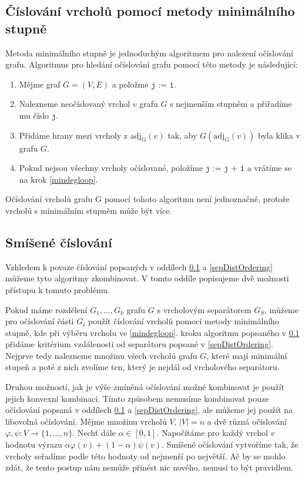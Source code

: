 \documentclass[11pt,american,czech,oneside]{book}
\theoremstyle{plain}
\theoremstyle{definition}
\begin{document}
\subsection{Číslování vrcholů pomocí metody minimálního stupně}
\label{MDordering}
Metoda minimálního stupně je jednoduchým algoritmem pro nalezení očíslování grafu. Algoritmus pro hledání očíslování grafu pomocí této metody je následující:

\begin{enumerate}
  \item Mějme graf $G=(V,E)$ a položme $\texttt{j := 1}$.
  \item \label{mindegloop}
      Nalezneme neočíslovaný vrchol $v$ grafu $G$ s nejmenším stupněm a přiřadíme mu číslo $\texttt{j}$.
  \item Přidáme hrany mezi vrcholy z $\mathrm{adj}_G(v)$ tak, aby $G(\mathrm{adj}_G(v))$ byla klika v grafu $G$.
  \item Pokud nejsou všechny vrcholy očíslované, položíme $\texttt{j := j + 1}$ a vrátíme se na krok \ref{mindegloop}.
\end{enumerate}

Očíslování vrcholů grafu G pomocí tohoto algoritmu není jednoznačné, protože vrcholů s minimálním stupněm může být více.

\subsection{Smíšené číslování}
\label{Mixedordering}
Vzhledem k povaze číslování popsaných v oddílech \ref{MDordering} a \ref{sepDistOrdering} můžeme tyto algoritmy zkombinovat. V tomto oddíle popisujeme dvě možnosti přístupu k tomuto problému.

Pokud máme rozdělení $G_1, \ldots, G_k$ grafu $G$ s vrcholovým separátorem $G_S$, můžeme pro očíslování části $G_i$ použít číslování vrcholů pomocí metody minimálního stupně, kde při výběru vrcholu ve \ref{mindegloop}. kroku algoritmu popsaného v \ref{MDordering} přidáme kritérium vzdálenosti od separátoru popsané v \ref{sepDistOrdering}. Nejprve tedy nalezneme množinu všech vrcholů grafu $G$, které mají minimální stupeň a poté z nich zvolíme ten, který je nejdál od vrcholového separátoru.

Druhou možností, jak je výše zmíněná očíslování možné kombinovat je použít jejich konvexní kombinaci. Tímto způsobem nemusíme kombinovat pouze očíslování popsaná v oddílech \ref{MDordering} a \ref{sepDistOrdering}, ale můžeme jej použít na libovolná očíslování. Mějme množinu vrcholů $V$, $|V|=n$ a dvě různá očíslování $\varphi,\psi :V \rightarrow \{1,\ldots,n\}$. Nechť dále $\alpha \in [0,1]$. Napočítáme pro každý vrchol $v$ hodnotu výrazu $\alpha\varphi(v) + (1-\alpha)\psi(v)$. Smíšené očíslování vytvoříme tak, že vrcholy seřadíme podle této hodnoty od nejmenší po největší. Ač by se mohlo zdát, že tento postup nám nemůže přinést nic nového, nemusí to být pravidlem\cite{slo:89,resc:99}.
\end{document}

